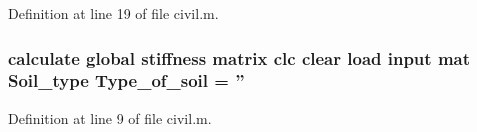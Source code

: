 Definition at line 19 of file civil.\-m.

\subsubsection[{Type\-\_\-of\-\_\-soil}]{\setlength{\rightskip}{0pt plus 5cm}calculate global stiffness matrix {\bf clc} {\bf clear} load input mat Soil\-\_\-type Type\-\_\-of\-\_\-soil = ''}\label{civil_8m_ac99038f2b9e5cc7205903d742faffd30}


Definition at line 9 of file civil.\-m.

